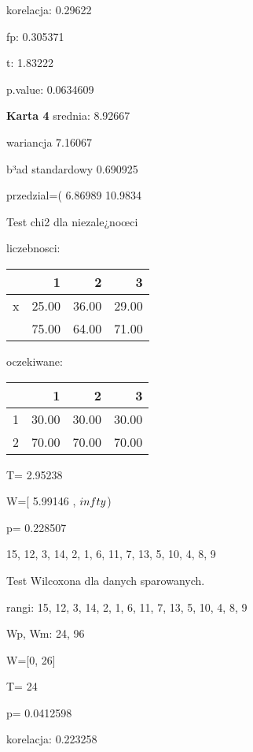 \documentclass[a4paper,12pt]{article}
\begin{document}
\begin{multicols}{3}
  korelacja: 0.29622
     
     fp: 0.305371
     
     t: 1.83222
     
     p.value: 0.0634609 \vspace{1cm} 

  \textbf{Karta  4 } 
 srednia: 8.92667 
     
     wariancja 7.16067  
     
     b³ad standardowy 0.690925 
     
     przedzial=( 6.86989 10.9834 \vspace{1cm} 

  Test chi2 dla niezale¿noœci 
   
   liczebnosci: %
\begin{tabular}{rrrr}
  \hline
 & 1 & 2 & 3 \\
  \hline
x & 25.00 & 36.00 & 29.00 \\
   & 75.00 & 64.00 & 71.00 \\
   \hline
\end{tabular}
 
   
   oczekiwane: %
\begin{tabular}{rrrr}
  \hline
 & 1 & 2 & 3 \\
  \hline
1 & 30.00 & 30.00 & 30.00 \\
  2 & 70.00 & 70.00 & 70.00 \\
   \hline
\end{tabular}
 
   
   T= 2.95238 
   
   W=[ 5.99146 , $\\infty$) 
   
   p= 0.228507 \vspace{1cm} 

  15, 12, 3, 14, 2, 1, 6, 11, 7, 13, 5, 10, 4, 8, 9 

  Test Wilcoxona dla danych sparowanych. 
  
  rangi: 15, 12, 3, 14, 2, 1, 6, 11, 7, 13, 5, 10, 4, 8, 9 
  
  Wp, Wm:  24,  96 
  
  W=[0, 26]  
  
  T=  24 
  
  p= 0.0412598 \vspace{1cm} 

  korelacja: 0.223258
     

\end{multicols}
\end{document}

